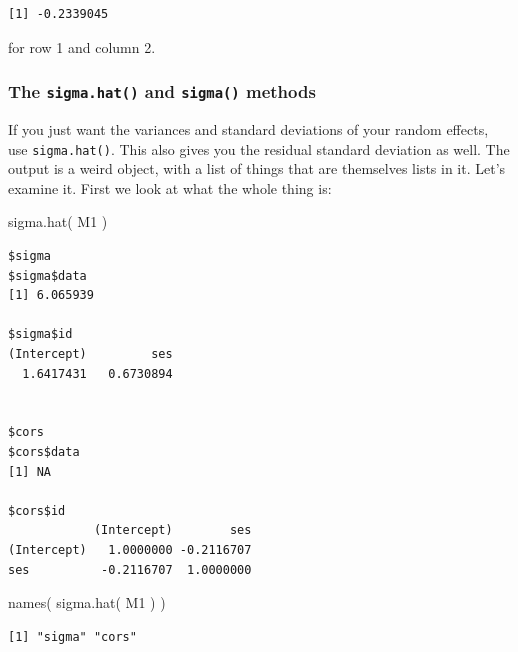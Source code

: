 \documentclass[
  letterpaper,
  DIV=11,
  numbers=noendperiod]{scrreprt}
\newenvironment{Shaded}{\begin{snugshade}}{\end{snugshade}}
\newcommand{\FunctionTok}[1]{\textcolor[rgb]{0.02,0.16,0.49}{#1}}
\newcommand{\NormalTok}[1]{\textcolor[rgb]{0.00,0.44,0.13}{#1}}
\newcommand{\SpecialCharTok}[1]{\textcolor[rgb]{0.25,0.44,0.63}{#1}}
\begin{document}
\begin{verbatim}
[1] -0.2339045
\end{verbatim}

for row 1 and column 2.

\hypertarget{the-sigma.hat-and-sigma-methods}{%
\subsubsection{\texorpdfstring{The \texttt{sigma.hat()} and
\texttt{sigma()}
methods}{The sigma.hat() and sigma() methods}}\label{the-sigma.hat-and-sigma-methods}}

If you just want the variances and standard deviations of your random
effects, use \texttt{sigma.hat()}. This also gives you the residual
standard deviation as well. The output is a weird object, with a list of
things that are themselves lists in it. Let's examine it. First we look
at what the whole thing is:

\begin{Shaded}
\begin{Highlighting}[]
\FunctionTok{sigma.hat}\NormalTok{( M1 )}
\end{Highlighting}
\end{Shaded}

\begin{verbatim}
$sigma
$sigma$data
[1] 6.065939

$sigma$id
(Intercept)         ses 
  1.6417431   0.6730894 


$cors
$cors$data
[1] NA

$cors$id
            (Intercept)        ses
(Intercept)   1.0000000 -0.2116707
ses          -0.2116707  1.0000000
\end{verbatim}

\begin{Shaded}
\begin{Highlighting}[]
\FunctionTok{names}\NormalTok{( }\FunctionTok{sigma.hat}\NormalTok{( M1 ) )}
\end{Highlighting}
\end{Shaded}

\begin{verbatim}
[1] "sigma" "cors" 
\end{verbatim}

\begin{Shaded}
\end{Shaded}
\end{document}
